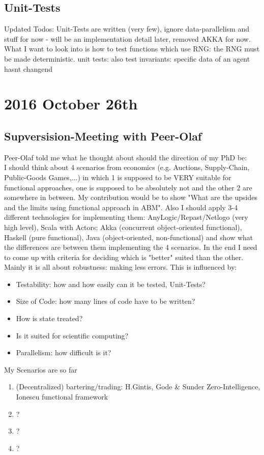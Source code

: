 \subsection*{Unit-Tests}
Updated Todos: Unit-Tests are written (very few), ignore data-parallelism and stuff for now - will be an implementation detail later, removed AKKA for now. What I want to look into is how to test functions which use RNG: the RNG must be made deterministic.
unit tests: also test invariants: specific data of an agent hasnt changend


\section*{2016 October 26th}

\subsection*{Supversision-Meeting with Peer-Olaf}
Peer-Olaf told me what he thought about should the direction of my PhD be: \\
I should think about 4 scenarios from economics (e.g. Auctions, Supply-Chain, Public-Goods Games,...) in which 1 is supposed to be VERY suitable for functional approaches, one is supposed to be absolutely not and the other 2 are somewhere in between. My contribution would be to show "What are the upsides and the limits using functional approach in ABM". Also I should apply 3-4 different technologies for implementing them: AnyLogic/Repast/Netlogo (very high level), Scala with Actors: Akka (concurrent object-oriented functional), Haskell (pure functional), Java (object-oriented, non-functional) and show what the differences are between them implementing the 4 scenarios. In the end I need to come up with criteria for deciding which is "better" suited than the other. Mainly it is all about robustness: making less errors. This is influenced by:

\begin{itemize}
\item Testability: how and how easily can it be tested, Unit-Tests?
\item Size of Code: how many lines of code have to be written?
\item How is state treated?
\item Is it suited for scientific computing?
\item Parallelism: how difficult is it?
\end{itemize}

My Scenarios are so far
\begin{enumerate}
\item (Decentralized) bartering/trading: H.Gintis, Gode \& Sunder Zero-Intelligence, Ionescu functional framework
\item ?
\item ?
\item ?
\end{enumerate}